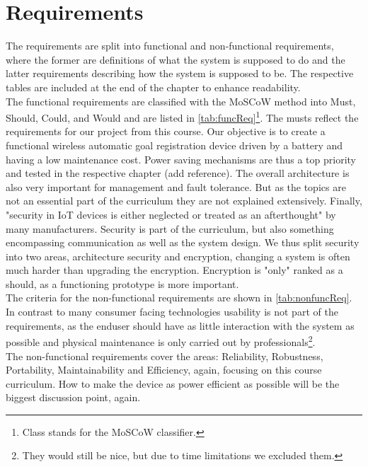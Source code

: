 \section{Requirements}
The requirements are split into functional and non-functional requirements, where the former are definitions of what the system is supposed to do and the latter requirements describing how the system is supposed to be. The respective tables are included at the end of the chapter to enhance readability.\\
The functional requirements are classified with the MoSCoW method into Must, Should, Could, and Would and are listed in \cref{tab:funcReq}\footnote{Class stands for the MoSCoW classifier.}. The musts reflect the requirements for our project from this course. Our objective is to create a functional wireless automatic goal registration device driven by a battery and having a low maintenance cost. Power saving mechanisms are thus a top priority and tested in the respective chapter (add reference). The overall architecture is also very important for management and fault tolerance. But as the topics are not an essential part of the curriculum they are not explained extensively. Finally, "security in IoT devices is either neglected or treated as an afterthought"\cite{wurm2016securityAftertought} by many manufacturers. Security is part of the curriculum, but also something encompassing communication as well as the system design. We thus split security into two areas, architecture security and encryption, changing a system is often much harder than upgrading the encryption. Encryption is "only" ranked as a should, as a functioning prototype is more important.\\
The criteria for the non-functional requirements are shown in \cref{tab:nonfuncReq}.
In contrast to many consumer facing technologies usability is not part of the requirements, as the enduser should have as little interaction with the system as possible and physical maintenance is only carried out by professionals\footnote{They would still be nice, but due to time limitations we excluded them.}.\\ 
The non-functional requirements cover the areas: Reliability, Robustness, Portability, Maintainability and Efficiency, again, focusing on this course curriculum. How to make the device as power efficient as possible will be the biggest discussion point, again.

